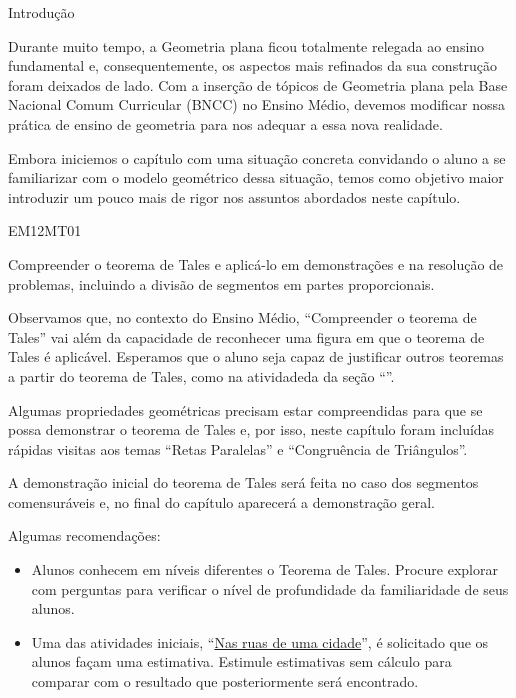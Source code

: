 \mainmatter


\begin{apresentacao}{Introdução}


Durante muito tempo, a Geometria plana ficou totalmente relegada ao ensino fundamental e, consequentemente, os aspectos mais refinados da sua construção foram deixados de lado. Com a inserção de tópicos de Geometria plana pela Base Nacional Comum Curricular (BNCC) no Ensino Médio, devemos modificar nossa prática de ensino de geometria para nos adequar a  essa nova realidade.


Embora iniciemos o capítulo com uma situação concreta convidando o aluno a se familiarizar com o modelo geométrico dessa situação, temos como objetivo maior introduzir um pouco mais de rigor nos assuntos abordados neste capítulo.


\begin{habilities}{EM12MT01}

Compreender o teorema de Tales e aplicá-lo em demonstrações e na resolução de problemas, incluindo a divisão de segmentos em partes proporcionais.
\end{habilities}

Observamos que, no contexto do Ensino Médio, “Compreender o teorema de Tales” vai além da capacidade de reconhecer uma figura em que o teorema de Tales é aplicável. Esperamos que o aluno seja capaz de justificar outros teoremas a partir do teorema de Tales, como na atividadeda da seção “”.

Algumas propriedades geométricas precisam estar compreendidas para que se possa demonstrar o teorema de Tales e, por isso, neste capítulo foram incluídas rápidas visitas aos temas “Retas Paralelas” e “Congruência de Triângulos”.

A demonstração inicial do teorema de Tales será feita no caso dos segmentos comensuráveis e, no final do capítulo aparecerá a demonstração geral.

Algumas recomendações:
\begin{itemize}
\item {} 
Alunos conhecem em níveis diferentes o Teorema de Tales. Procure explorar com perguntas para verificar o nível de profundidade da familiaridade de seus alunos.

\item {} 
Uma das atividades iniciais, ``\hyperref[nas-ruas]{Nas ruas de uma cidade}”, é solicitado que os alunos façam uma estimativa. Estimule estimativas sem cálculo para comparar com o resultado que posteriormente será encontrado.


\end{itemize}
\end{apresentacao}
